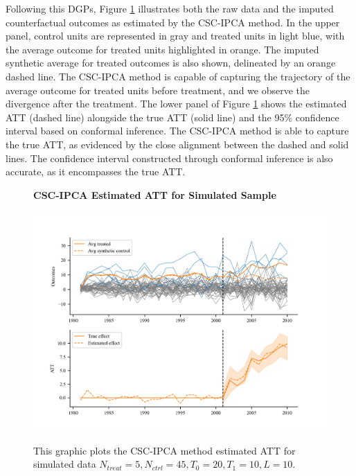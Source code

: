\documentclass[12pt]{article}
\begin{document}
Following this DGPs, Figure \ref{fig: est} illustrates both the raw data and the imputed counterfactual outcomes as estimated by the CSC-IPCA method. In the upper panel, control units are represented in gray and treated units in light blue, with the average outcome for treated units highlighted in orange. The imputed synthetic average for treated outcomes is also shown, delineated by an orange dashed line. The CSC-IPCA method is capable of capturing the trajectory of the average outcome for treated units before treatment, and we observe the divergence after the treatment. The lower panel of Figure \ref{fig: est} shows the estimated ATT (dashed line) alongside the true ATT (solid line) and the 95\% confidence interval based on conformal inference. The CSC-IPCA method is able to capture the true ATT, as evidenced by the close alignment between the dashed and solid lines. The confidence interval constructed through conformal inference is also accurate, as it encompasses the true ATT.

\begin{figure}[!ht]
    \centering
    \caption{\textbf{CSC-IPCA Estimated ATT for Simulated Sample}}
    \includegraphics{figs/estimation.png}
    \label{fig: est}
    \caption*{\footnotesize{This graphic plots the CSC-IPCA method estimated ATT for simulated data $N_{treat} = 5, N_{ctrl} = 45, T_0=20, T_1=10, L=10$.}}
    \end{figure}
\end{document}
